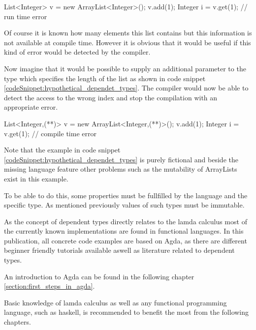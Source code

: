 \begin{codesnippet}[caption={ArrayList index error}, label={codeSnippet:array_index_error}]
List<Integer> v = new ArrayList<Integer>();
v.add(1);
Integer i = v.get(1); // run time error
\end{codesnippet}

Of course it is known how many elements this list contains but this information is not available at compile time. 
However it is obvious that it would be useful if this kind of error would be detected by the compiler. 

Now imagine that it would be possible to supply an additional parameter to the type which specifies the length of the list as shown in code snippet \ref{codeSnippet:hypothetical_dependet_types}. 
The compiler would now be able to detect the access to the wrong index and stop the compilation with an appropriate error.

\begin{codesnippet}[escapeinside={(*}{*)}, caption={ArrayList with size parameter}, label={codeSnippet:hypothetical_dependet_types}]
List<Integer,(**)> v = new ArrayList<Integer,(**)>();
v.add(1);
Integer i = v.get(1); // compile time error
\end{codesnippet}


Note that the example in code snippet \ref{codeSnippet:hypothetical_dependet_types} is purely fictional and beside the missing language feature other problems such as the mutability of ArrayLists exist in this example.

To be able to do this, some properties must be fullfilled by the language and the specific type. 
As mentioned previously values of such types must be immutable. 

As the concept of dependent types directly relates to the lamda calculus most of the currently known implementations are found in functional languages. 
In this publication, all concrete code examples are based on Agda, as there are different beginner friendly tutorials available aswell as literature related to dependent types.

An introduction to Agda can be found in the following chapter \ref{section:first_steps_in_agda}.

Basic knowledge of lamda calculus as well as any functional programming language, such as haskell, is recommended to benefit the most from the following chapters.
